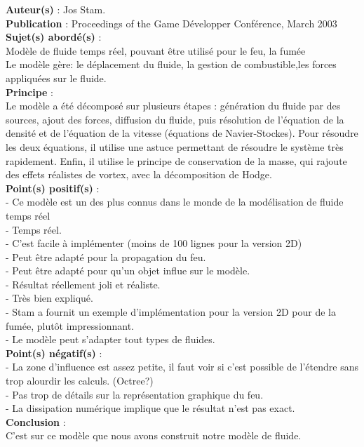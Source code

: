 \documentclass[a4paper,10pt]{article}
\begin{document}
\textbf{Auteur(s)} : Jos Stam.\\
\textbf{Publication} : Proceedings of the Game Développer Conférence, March 2003 \\
\textbf{Sujet(s) abordé(s)} : \\
    Modèle de fluide temps réel, pouvant être utilisé pour le feu, la fumée\\
	Le modèle gère: le déplacement du fluide, la gestion de combustible,les forces appliquées sur le fluide.\\	
\textbf{Principe} :\\
	Le modèle a été décomposé sur plusieurs étapes : génération du fluide par des sources, ajout des forces, diffusion du fluide, puis résolution de l'équation de la densité et de l'équation de la vitesse (équations de Navier-Stockes).
	Pour résoudre les deux équations, il utilise une astuce permettant de résoudre le système très rapidement.
	Enfin, il utilise le principe de conservation de la masse, qui rajoute des effets réalistes de vortex, avec la décomposition de Hodge.\\
\textbf{Point(s) positif(s)} :\\
    - Ce modèle est un des plus connus dans le monde de la modélisation de fluide temps réel\\
	- Temps réel.\\
	- C'est facile à implémenter (moins de 100 lignes pour la version 2D)\\
	- Peut être adapté pour la propagation du feu.\\
	- Peut être adapté pour qu'un objet influe sur le modèle.\\
	- Résultat réellement joli et réaliste.\\
	- Très bien expliqué.\\
	- Stam a fournit un exemple d'implémentation pour la version 2D pour de la fumée, plutôt impressionnant.\\
	- Le modèle peut s'adapter tout types de fluides.\\
\textbf{Point(s) négatif(s)} :\\
	- La zone d'influence est assez petite, il faut voir si c'est possible de l'étendre sans trop alourdir les calculs. (Octree?) \\
	- Pas trop de détails sur la représentation graphique du feu.\\	
	- La dissipation numérique implique que le résultat n'est pas exact.\\
\textbf{Conclusion} :\\
	C'est sur ce modèle que nous avons construit notre modèle de fluide.
\end{document}
